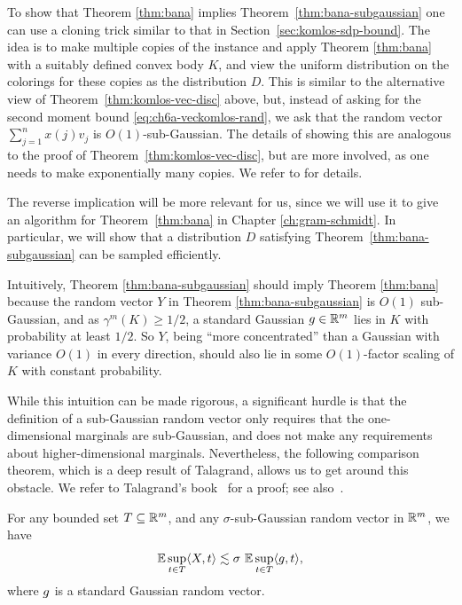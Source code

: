 To show that Theorem \ref{thm:bana} implies Theorem~\ref{thm:bana-subgaussian} one can
 use a cloning trick similar to that in Section~\ref{sec:komlos-sdp-bound}.
The idea is to make multiple copies of the instance and apply Theorem
\ref{thm:bana} with a suitably defined convex body $K$, and view the
uniform distribution on the colorings for these copies as the
distribution $D$. This is similar to the alternative view of
Theorem~\ref{thm:komlos-vec-disc} above, but, instead of asking for
the second moment bound \eqref{eq:ch6a-veckomlos-rand}, we ask that
the random vector $\sum_{j = 1}^n x(j) v_j$ is $O(1)$-sub-Gaussian. 
The details of showing this are analogous to the proof of
Theorem~\ref{thm:komlos-vec-disc}, but are more involved, as one needs
to make exponentially many copies. We refer to \cite{rothvoss-online} for details.


The reverse implication will be more relevant for us, since we will
use it to give an algorithm for Theorem~\ref{thm:bana} in Chapter
\ref{ch:gram-schmidt}. In particular, we will show that a
distribution $D$ satisfying Theorem~\ref{thm:bana-subgaussian} can be
sampled efficiently.

 Intuitively, Theorem \ref{thm:bana-subgaussian} should imply Theorem \ref{thm:bana} because 
 the random vector $Y$ in Theorem \ref{thm:bana-subgaussian} is $O(1)$ sub-Gaussian, and as $\gamma^m(K)\geq 1/2$, a standard Gaussian $g \in \mathbb{R}^m$ lies in $K$ with probability at least $1/2$.
So $Y$, being ``more concentrated'' than a Gaussian with variance
$O(1)$ in every direction, should also lie in some $O(1)$-factor scaling of $K$ with
constant probability. 

While this intuition can be made rigorous, a
significant hurdle is that the definition of a sub-Gaussian random
vector only requires that the one-dimensional marginals are
sub-Gaussian, and does not make any requirements about
higher-dimensional marginals. Nevertheless, the following comparison
theorem, which is a deep result of Talagrand, allows us to get around
this obstacle. We refer to Talagrand's book~\cite{Talagrand-book} for
a proof; see also~\cite[Section 8.6]{vershynin}.

\begin{theorem}\label{thm:ch6a-talagrand}
  For any bounded set $T \subseteq \mathbb{R}^m$, and any $\sigma$-sub-Gaussian
  random vector in $\mathbb{R}^m$, we have
  \[
    \mathbb{E} \sup_{t \in T} \langle X,t\rangle \lesssim \sigma \,\,  \mathbb{E}\sup_{t \in T}
    \langle g, t\rangle,
  \]
  where $g$ is a standard Gaussian random vector. 
\end{theorem}

